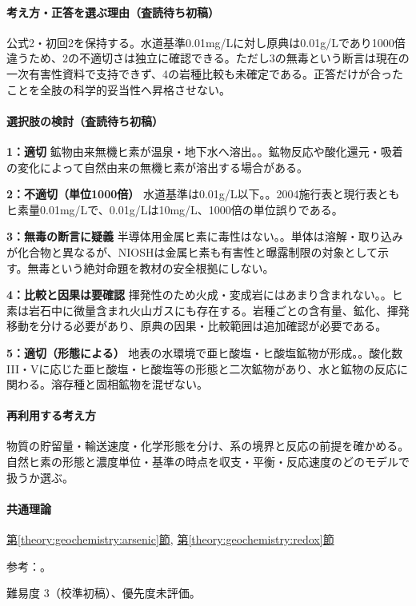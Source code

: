 \paragraph{考え方・正答を選ぶ理由（査読待ち初稿）} 公式2・初回2を保持する。水道基準0.01mg/Lに対し原典は0.01g/Lであり1000倍違うため、2の不適切さは独立に確認できる。ただし3の無毒という断言は現在の一次有害性資料で支持できず、4の岩種比較も未確定である。正答だけが合ったことを全肢の科学的妥当性へ昇格させない。

\paragraph{選択肢の検討（査読待ち初稿）}\mbox{}\par

\noindent\textbf{1：適切} 鉱物由来無機ヒ素が温泉・地下水へ溶出。。鉱物反応や酸化還元・吸着の変化によって自然由来の無機ヒ素が溶出する場合がある。\par

\noindent\textbf{2：不適切（単位1000倍）} 水道基準は0.01g/L以下。。2004施行表と現行表ともヒ素量0.01mg/Lで、0.01g/Lは10mg/L、1000倍の単位誤りである。\par

\noindent\textbf{3：無毒の断言に疑義} 半導体用金属ヒ素に毒性はない。。単体は溶解・取り込みが化合物と異なるが、NIOSHは金属ヒ素も有害性と曝露制限の対象として示す。無毒という絶対命題を教材の安全根拠にしない。\par

\noindent\textbf{4：比較と因果は要確認} 揮発性のため火成・変成岩にはあまり含まれない。。ヒ素は岩石中に微量含まれ火山ガスにも存在する。岩種ごとの含有量、鉱化、揮発移動を分ける必要があり、原典の因果・比較範囲は追加確認が必要である。\par

\noindent\textbf{5：適切（形態による）} 地表の水環境で亜ヒ酸塩・ヒ酸塩鉱物が形成。。酸化数III・Vに応じた亜ヒ酸塩・ヒ酸塩等の形態と二次鉱物があり、水と鉱物の反応に関わる。溶存種と固相鉱物を混ぜない。\par

\paragraph{再利用する考え方} 物質の貯留量・輸送速度・化学形態を分け、系の境界と反応の前提を確かめる。自然ヒ素の形態と濃度単位・基準の時点を収支・平衡・反応速度のどのモデルで扱うか選ぶ。

\paragraph{共通理論} \hyperref[theory:geochemistry:arsenic]{第\ref*{theory:geochemistry:arsenic}節}, \hyperref[theory:geochemistry:redox]{第\ref*{theory:geochemistry:redox}節}

\par 参考：\cite{gc_hem,gc_arsenic2004,gc_arsenic_current,gc_arsenic_hazard}。

\par 難易度 3（校準初稿）、優先度未評価。

